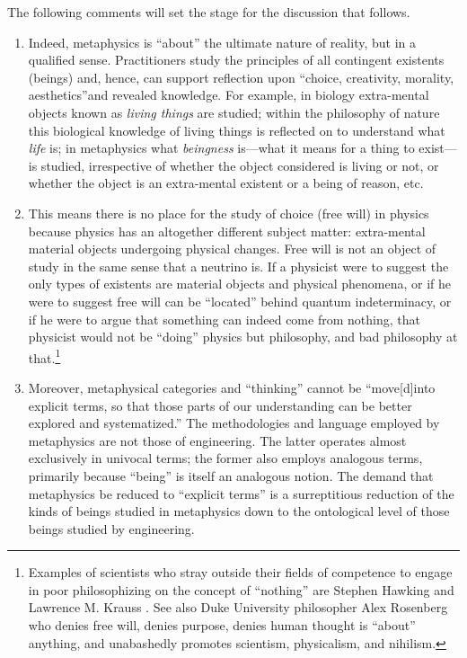 The following comments will set the stage for the discussion that follows.

\begin{enumerate}
\item Indeed, metaphysics is ``about'' the ultimate nature of reality, but in a qualified sense. Practitioners study the principles of all contingent existents (beings) and, hence, can support reflection upon ``choice, creativity, morality, aesthetics''{\jdots}and revealed knowledge. For example, in biology extra-mental objects known as \textit{living things} are studied; within the philosophy of nature this biological knowledge of living things is reflected on to understand what \textit{life} is; in metaphysics what \textit{beingness} is---what it means for a thing to exist---is studied, irrespective of whether the object considered is living or not, or whether the object is an extra-mental existent or a being of reason, etc.
\item This means there is no place for the study of choice (free will) in physics because physics has an altogether different subject matter: extra-mental material objects undergoing physical changes. Free will is not an object of study in the same sense that a neutrino is. If a physicist were to suggest the only types of existents are material objects and physical phenomena, or if he were to suggest free will can be ``located'' behind quantum indeterminacy, or if he were to \mbox{argue} that something can indeed come from nothing, that physicist would not be ``doing'' physics but philosophy, and bad philosophy at that.\footnote{Examples 
of scientists who stray outside their fields of competence to engage in poor philosophizing on the concept of “nothing” are Stephen Hawking \citeyearpar{hawking2012} and Lawrence M. Krauss \citeyearpar{krauss2013}. 
See also Duke University philosopher Alex Rosenberg \citeyearpar{rosenberg2013} who denies free will, denies purpose, denies human thought is “about” anything, and unabashedly promotes scientism, physicalism, and nihilism.}
\item Moreover, metaphysical categories and ``thinking'' cannot be ``move[d]{\jdots}into explicit terms, so that those parts of our understanding can be better explored and systematized.'' The methodologies and language employed by metaphysics are not those of engineering. The latter operates almost exclusively in univocal terms; the former also employs analogous terms, primarily because ``being'' is itself an analogous notion. The demand that metaphysics be reduced to ``explicit terms'' is a surreptitious reduction of the kinds of beings studied in metaphysics down to the ontological level of those beings studied by engineering.

\end{enumerate}
